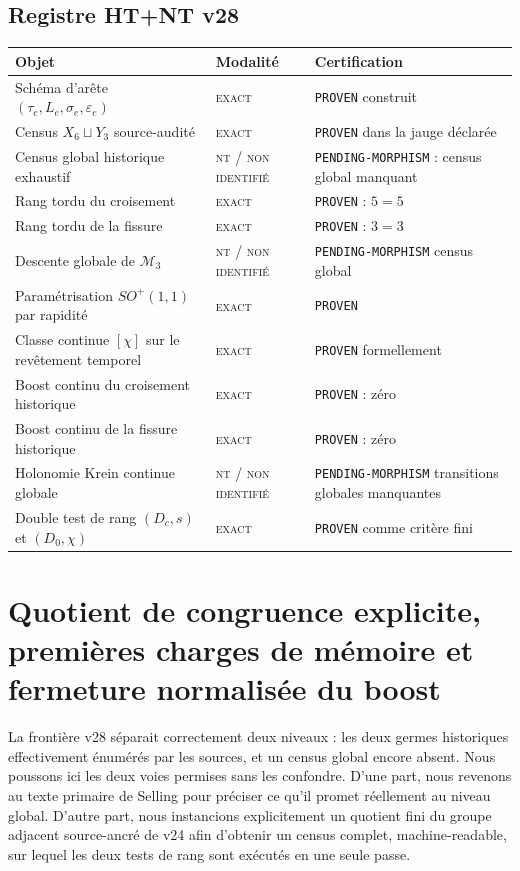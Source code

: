 \documentclass[11pt,a4paper]{article}
\newcommand{\statusExact}{\textsc{exact}}
\newcommand{\statusNT}{\textsc{nt / non identifié}}
\newcommand{\certProven}{\texttt{PROVEN}}
\newcommand{\certPending}{\texttt{PENDING-MORPHISM}}
\begin{document}
\subsection{Registre HT+NT v28}

\begin{longtable}{p{}p{}p{}}
\toprule
Objet & Modalité & Certification\\
\midrule
\endhead
Schéma d'arête $(\tau_e,L_e,\sigma_e,\varepsilon_e)$ & \statusExact & \certProven{} construit\\
Census $X_6\sqcup Y_3$ source-audité & \statusExact & \certProven{} dans la jauge déclarée\\
Census global historique exhaustif & \statusNT & \certPending{} : census global manquant\\
Rang tordu du croisement & \statusExact & \certProven{} : $5=5$\\
Rang tordu de la fissure & \statusExact & \certProven{} : $3=3$\\
Descente globale de $\mathcal M_3$ & \statusNT & \certPending{} census global\\
Paramétrisation $SO^+(1,1)$ par rapidité & \statusExact & \certProven\\
Classe continue $[\chi]$ sur le revêtement temporel & \statusExact & \certProven{} formellement\\
Boost continu du croisement historique & \statusExact & \certProven{} : zéro\\
Boost continu de la fissure historique & \statusExact & \certProven{} : zéro\\
Holonomie Krein continue globale & \statusNT & \certPending{} transitions globales manquantes\\
Double test de rang $(D_c,s)$ et $(D_0,\chi)$ & \statusExact & \certProven{} comme critère fini\\
\bottomrule
\end{longtable}



\section{Quotient de congruence explicite, premières charges de mémoire et fermeture normalisée du boost}\label{sec:v29-congruence-census}

La frontière v28 séparait correctement deux niveaux : les deux germes historiques effectivement énumérés par les sources, et un census global encore absent. Nous poussons ici les deux voies permises sans les confondre. D'une part, nous revenons au texte primaire de Selling pour préciser ce qu'il promet réellement au niveau global. D'autre part, nous instancions explicitement un quotient fini du groupe adjacent source-ancré de v24 afin d'obtenir un census complet, machine-readable, sur lequel les deux tests de rang sont exécutés en une seule passe.
\end{document}
